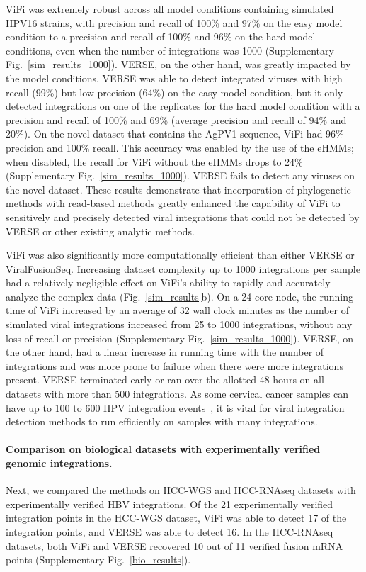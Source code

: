 \documentclass[a4,center,fleqn]{NAR}
\begin{document}
ViFi was extremely robust across all model conditions containing
simulated HPV16 strains, with precision and recall of 100\% and 97\% on the
easy model condition to a precision and recall of 100\% and 96\% on
the hard model conditions, even when the number of integrations
was 1000 (Supplementary Fig.~\ref{sim_results_1000}). VERSE, on the other hand, was greatly
impacted by the model conditions.  VERSE was able to detect integrated
viruses with high recall (99\%) but low precision (64\%) on the easy
model condition, but it only detected integrations on one of the
replicates for the hard model condition with a precision and recall of
100\% and 69\% (average precision and recall of 94\% and 20\%).  On
the novel dataset that contains the AgPV1 sequence, ViFi had 96\%
precision and 100\% recall.  This accuracy was enabled by the use of
the eHMMs; when disabled, the recall for ViFi without the
eHMMs drops to 24\% (Supplementary Fig.~\ref{sim_results_1000}).  VERSE fails to
detect any viruses on the novel dataset.  These results demonstrate
that incorporation of phylogenetic methods with read-based methods
greatly enhanced the capability of ViFi to sensitively and precisely
detected viral integrations that could not be detected by VERSE or
other existing analytic methods.

ViFi was also significantly more computationally efficient than either
VERSE or ViralFusionSeq. Increasing dataset complexity up to 1000
integrations per sample had a relatively negligible effect on ViFi's
ability to rapidly and accurately analyze the complex data
(Fig.~\ref{sim_results}b). On a 24-core node, the running time of ViFi
increased by an average of 32 wall clock minutes as the number of simulated viral
integrations increased from 25 to 1000 integrations, without any loss
of recall or precision (Supplementary Fig.~\ref{sim_results_1000}).  VERSE, on the
other hand, had a linear increase in running time with the number of
integrations and was more prone to failure when there were more
integrations present.  VERSE terminated early or ran over the allotted
48 hours on all datasets with more than 500 integrations.  As some
cervical cancer samples can have up to 100 to 600 HPV integration
events~\cite{Hu2015}, it is vital for viral integration detection
methods to run efficiently on samples with many integrations.

\paragraph{\textbf{Comparison on biological datasets with experimentally verified genomic integrations.}}  Next, we compared the methods on
HCC-WGS and HCC-RNAseq datasets with experimentally verified HBV
integrations.  Of the 21 experimentally verified integration points in
the HCC-WGS dataset, ViFi was able to detect 17 of the integration
points, and VERSE was able to detect 16.  In the HCC-RNAseq datasets,
both ViFi and VERSE recovered 10 out of 11 verified fusion mRNA points
(Supplementary Fig.~\ref{bio_results}).
\end{document}
